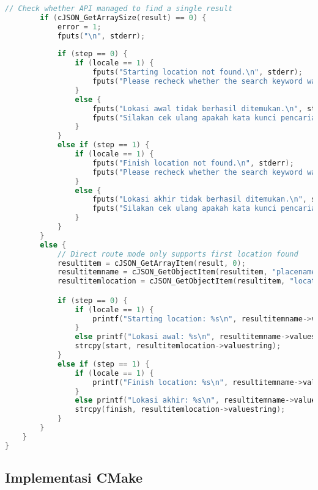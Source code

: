 \begin{itemize}[listparindent=\parindent]
\begin{lstlisting}[language=C, caption=Implementasi fungsi write\textunderscore searchplace\textunderscore noreturns(), label=code:kiritool-function-write-searchdirect]
        // Check whether API managed to find a single result
        if (cJSON_GetArraySize(result) == 0) {
            error = 1;
            fputs("\n", stderr);
            
            if (step == 0) {
                if (locale == 1) {
                    fputs("Starting location not found.\n", stderr);
                    fputs("Please recheck whether the search keyword was inputted correctly.\n", stderr);
                }
                else {
                    fputs("Lokasi awal tidak berhasil ditemukan.\n", stderr);
                    fputs("Silakan cek ulang apakah kata kunci pencarian sudah dimasukkan dengan benar.\n", stderr);
                }
            }
            else if (step == 1) {
                if (locale == 1) {
                    fputs("Finish location not found.\n", stderr);
                    fputs("Please recheck whether the search keyword was inputted correctly.\n", stderr);
                }
                else {
                    fputs("Lokasi akhir tidak berhasil ditemukan.\n", stderr);
                    fputs("Silakan cek ulang apakah kata kunci pencarian sudah dimasukkan dengan benar.\n", stderr);
                }
            }
        }
        else {
            // Direct route mode only supports first location found
            resultitem = cJSON_GetArrayItem(result, 0);
            resultitemname = cJSON_GetObjectItem(resultitem, "placename");
            resultitemlocation = cJSON_GetObjectItem(resultitem, "location");

            if (step == 0) {
                if (locale == 1) {
                    printf("Starting location: %s\n", resultitemname->valuestring);
                }
                else printf("Lokasi awal: %s\n", resultitemname->valuestring);
                strcpy(start, resultitemlocation->valuestring);
            }
            else if (step == 1) {
                if (locale == 1) {
                    printf("Finish location: %s\n", resultitemname->valuestring);
                }
                else printf("Lokasi akhir: %s\n", resultitemname->valuestring);
                strcpy(finish, resultitemlocation->valuestring);
            }
        }
    }
}
	\end{lstlisting}
	
	
\end{itemize}

\subsection{Implementasi CMake}
\label{sec:testing-implementation-cmake}


